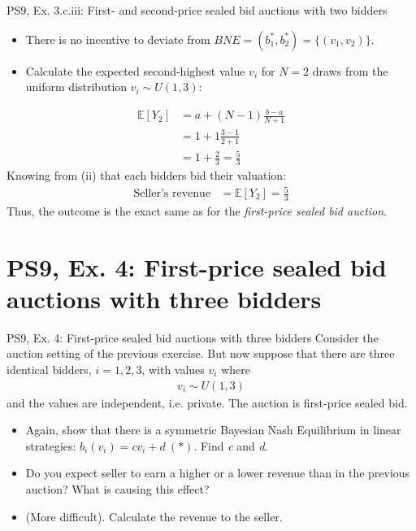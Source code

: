 \begin{frame}{PS9, Ex. 3.c.iii: First- and second-price sealed bid auctions with two bidders}
\begin{multicols}{2}
      \vspace{-20pt}
      \begin{itemize}
        \item[(ii)] There is no incentive to deviate from $BNE=(b_1^*,b_2^*)=\{(v_1,v_2)\}$.
        \item[(iii)] Calculate the expected second-highest value $v_i$ for $N=2$ draws from the uniform distribution $v_i\sim U(1,3)$:
      \end{itemize}
      \vspace{-18pt}
      \begin{align*}
        \mathbb{E}[Y_2]&=a+(N-1)\frac{b-a}{N+1}\\
                       &=1+1\frac{3-1}{2+1}\\
                       &=1+\frac{2}{3}=\frac{5}{3}
      \end{align*}
      Knowing from (ii) that each bidders bid their valuation:
      \vspace{-8pt}
      \begin{align*}
        \text{Seller's revenue}&=\mathbb{E}[Y_2]=\frac{5}{3}
      \end{align*}
      Thus, the outcome is the exact same as for the \textit{first-price sealed bid auction}.
      \vfill\null
    \end{multicols}
\end{frame}



\section{PS9, Ex. 4: First-price sealed bid auctions with three bidders}

\begin{frame}{PS9, Ex. 4: First-price sealed bid auctions with three bidders}
    Consider the auction setting of the previous exercise. But now suppose that there are three identical bidders, $i = 1, 2, 3$, with values $v_i$ where
    \begin{align*}
      v_i\sim U(1, 3)
    \end{align*}
    and the values are independent, i.e. private. The auction is first-price sealed bid.
    \begin{itemize}
      \item[(a)] Again, show that there is a symmetric Bayesian Nash Equilibrium in linear strategies: $b_i(v_i) = cv_i + d\ (*)$. Find \textit{c} and \textit{d}.
      \item[(b)] Do you expect seller to earn a higher or a lower revenue than in the previous auction? What is causing this effect?
      \item[(c)] (More difficult). Calculate the revenue to the seller.
    \end{itemize}
    \vfill\null
\end{frame}


